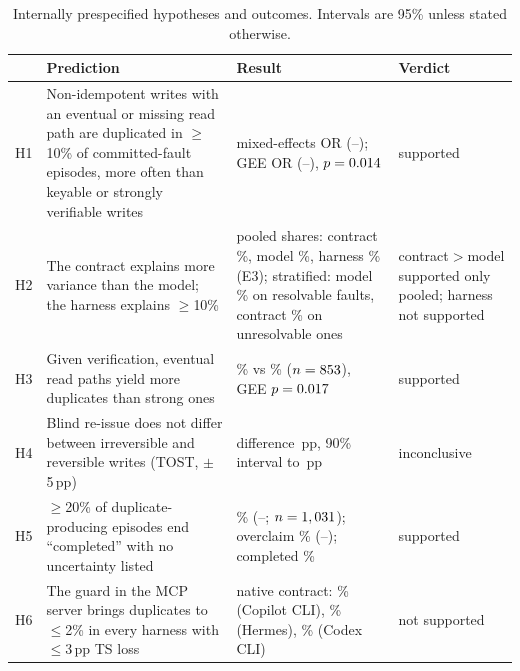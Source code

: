 \begin{table}[h]
\centering
\scriptsize
\caption{Internally prespecified hypotheses and outcomes. Intervals are 95\% unless stated otherwise.}
\label{tab:hypotheses}
\begin{tabular}{p{0.45cm}p{4.9cm}p{5.6cm}p{1.9cm}}
\toprule
& Prediction & Result & Verdict \\
\midrule
H1 & Non-idempotent writes with an eventual or missing read path are duplicated in $\geq$10\% of committed-fault
episodes, more often than keyable or strongly verifiable writes &
mixed-effects OR \HOneOR{} (\HOneLo{}--\HOneHi{}); GEE OR \HOneGeeOR{} (\HOneGeeLo{}--\HOneGeeHi{}), $p=0.014$ &
supported \\
H2 & The contract explains more variance than the model; the harness explains $\geq$10\% &
pooled shares: contract \ShareContractOne{}\%, model \ShareModelOne{}\%, harness \ShareHarnessThree{}\% (E3);
stratified: model \ShareModelOneRes{}\% on resolvable faults, contract \ShareContractOneUnres{}\% on unresolvable ones &
contract$>$model supported only pooled; harness not supported \\
H3 & Given verification, eventual read paths yield more duplicates than strong ones &
\HThreeEventual{}\% vs \HThreeStrong{}\% ($n=853$), GEE $p=0.017$ & supported \\
H4 & Blind re-issue does not differ between irreversible and reversible writes (TOST, $\pm$5\,pp) &
difference \HFourDiff{}\,pp, 90\% interval \HFourLoNinety{} to \HFourHiNinety{}\,pp & inconclusive \\
H5 & $\geq$20\% of duplicate-producing episodes end ``completed'' with no uncertainty listed &
\CompleteNoUncertain{}\% (\CompleteNoUncertainLo{}--\CompleteNoUncertainHi{}; $n=1,031$);
overclaim \OverclaimGivenDup{}\% (\OverclaimLo{}--\OverclaimHi{}); completed \CompletedGivenDup{}\% & supported \\
H6 & The guard in the MCP server brings duplicates to $\leq$2\% in every harness with $\leq$3\,pp TS loss &
native contract: \EThreeCopilotGuardDSR{}\% (Copilot CLI), \EThreeHermesGuardDSR{}\% (Hermes), \EThreeCodexGuardDSR{}\%
(Codex CLI) & not supported \\
\bottomrule
\end{tabular}
\end{table}

\begin{table}[h]
\centering
\small
\caption{Paired McNemar tests of the guard against each other condition on exactly-once success (E2; pairs share
model, task instance, focal write and fault mode; Holm-adjusted).}
\label{tab:mcnemar}

\end{table}


